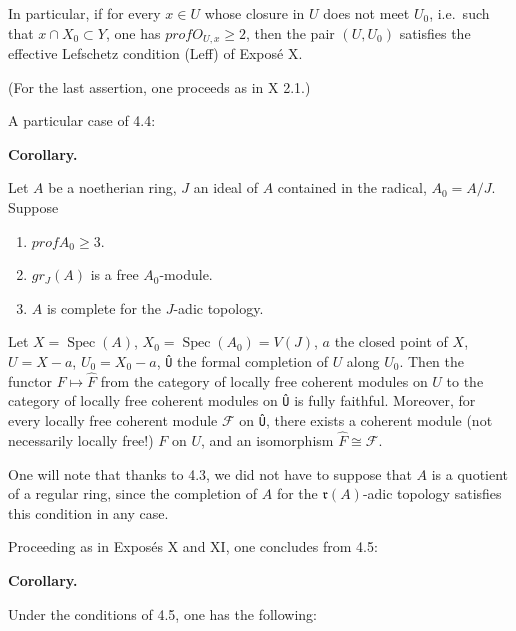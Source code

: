 \documentclass[
]{article}
\providecommand{\tightlist}{%
  \setlength{\itemsep}{0pt}\setlength{\parskip}{0pt}}
\begin{document}
In particular, if for every \(x \in U\) whose closure in \(U\) does not
meet \(U_{0}\), i.e.~such that \({x} \cap X_{0} \subset Y\), one has
\(prof O_{U,x} \geqslant 2\), then the pair \((U, U_{0})\) satisfies the
effective Lefschetz condition (Leff) of Exposé X.

(For the last assertion, one proceeds as in X 2.1.)

A particular case of 4.4:

\textbf{Corollary.}

Let \(A\) be a noetherian ring, \(J\) an ideal of \(A\) contained in the
radical, \(A_{0} = A/J\). Suppose

\begin{enumerate}
\def\labelenumi{\arabic{enumi}.}
\tightlist
\item
  \(prof A_{0} \geqslant 3\).
\item
  \(gr_{J}(A)\) is a free \(A_{0}\)-module.
\item
  \(A\) is complete for the \(J\)-adic topology.
\end{enumerate}

Let \(X = \operatorname{Spec}(A)\),
\(X_{0} = \operatorname{Spec}(A_{0}) = V(J)\), \(a\) the closed point of
\(X\), \(U = X - {a}\), \(U_{0} = X_{0} - {a}\), \texttt{Û} the formal
completion of \(U\) along \(U_{0}\). Then the functor
\(F \mapsto \hat{F}\) from the category of locally free coherent modules
on \(U\) to the category of locally free coherent modules on \texttt{Û}
is fully faithful. Moreover, for every locally free coherent module
\(\mathcal{F}\) on \texttt{Û}, there exists a coherent module (not
necessarily locally free!) \(F\) on \(U\), and an isomorphism
\(\hat{F} \cong \mathcal{F}\).

One will note that thanks to 4.3, we did not have to suppose that \(A\)
is a quotient of a regular ring, since the completion of \(A\) for the
\(\mathfrak{r}(A)\)-adic topology satisfies this condition in any case.

Proceeding as in Exposés X and XI, one concludes from 4.5:

\textbf{Corollary.}

Under the conditions of 4.5, one has the following:
\end{document}
